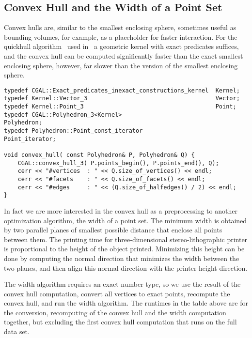 \subsection{Convex Hull and the Width of a Point Set}

Convex hulls are, similar to the smallest enclosing sphere, sometimes
useful as bounding volumes, for example, as a placeholder for faster
interaction. For the quickhull algorithm~\cite{bdh-qach-96} used
in \cgal\ a geometric kernel with exact predicates suffices,
and the convex hull can be computed significantly faster than the
exact smallest enclosing sphere, however, far slower than the
 version of the smallest enclosing sphere.

\begin{lstlisting}
typedef CGAL::Exact_predicates_inexact_constructions_kernel  Kernel;
typedef Kernel::Vector_3                                     Vector;
typedef Kernel::Point_3                                      Point;
typedef CGAL::Polyhedron_3<Kernel>                           Polyhedron;
typedef Polyhedron::Point_const_iterator                     Point_iterator;

void convex_hull( const Polyhedron& P, Polyhedron& Q) {
    CGAL::convex_hull_3( P.points_begin(), P.points_end(), Q);
    cerr << "#vertices  : " << Q.size_of_vertices() << endl;
    cerr << "#facets    : " << Q.size_of_facets() << endl;
    cerr << "#edges     : " << (Q.size_of_halfedges() / 2) << endl;
}
\end{lstlisting}


In fact we are more interested in the convex hull as a preprocessing
to another optimization algorithm, the width of a point set. The
minimum width is obtained by two parallel planes of smallest possible
distance that enclose all points between them. The printing time for
three-dimensional stereo-lithographic printer is proportional to the
height of the object printed. Minimizing this height can be done by
computing the normal direction that minimizes the width between the
two planes, and then align this normal direction with the printer
height direction.

The width algorithm requires an exact number type, so we use the
result of the convex hull computation, convert all vertices to exact
points, recompute the convex hull, and run the width algorithm. The
runtimes in the table above are for the conversion, recomputing of the
convex hull and the width computation together, but excluding the
first convex hull computation that runs on the full data set.


